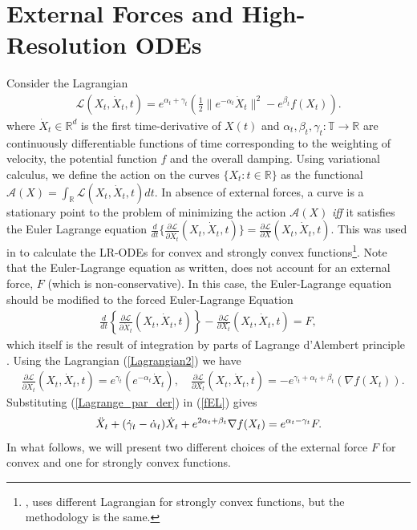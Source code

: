 \documentclass{article}
\theoremstyle{plain}
\theoremstyle{definition}
\theoremstyle{remark}
\begin{document}
 
\section{External Forces and High-Resolution ODEs}\label{section2}
Consider the Lagrangian
\begin{align}\label{Lagrangian2}
    \mathcal{L}(X_t,\dot{X}_t,t) =e^{\alpha_t+\gamma_t}\left(\frac{1}{2}\|e^{-\alpha_t}\dot{X}_t\|^2-e^{\beta_t}f(X_t)\right). 
\end{align}
where \(\dot{X}_t\in \mathbb{R}^d\) is the first time-derivative of \(X(t)\) and \(\alpha_t,\beta_t,\gamma_t:\mathbb{T}\rightarrow \mathbb{R}\) are continuously differentiable functions of time corresponding to the weighting of velocity, the potential function \(f\) and the overall damping. Using variational calculus, we define the action on the curves \(\{X_t:t\in \mathbb R\}\) as the functional \(\mathcal{A}(X)=\int_{\mathbb R}\mathcal{L}(X_t,\dot X_t,t)dt \). In absence of external forces, a curve is a stationary point to the problem of minimizing the action \(\mathcal{A}(X)\) \textit{iff} it satisfies the Euler Lagrange equation \({\tfrac{d}{dt}\{  \tfrac{\partial \mathcal{L}}{\partial \dot{X}_t}(X_t,\dot{X}_t,t)  \}=\tfrac{\partial \mathcal{L}}{\partial X}(X_t,\dot{X}_t,t)}\). This was used in \citep{WibisonoE7351,wilson2021lyapunov} to calculate the LR-ODEs for convex and strongly convex functions\footnote{\citep{wilson2021lyapunov}, uses different Lagrangian for strongly convex functions, but the methodology is the same.}. Note that the Euler-Lagrange equation as written, does not account for an external force, \(F\) (which is non-conservative). In this case, the Euler-Lagrange equation should be modified to the forced Euler-Lagrange Equation
\begin{align}\label{fEL}
        \frac{d}{dt}\left\{  \frac{\partial \mathcal{L}}{\partial \dot{X}_t}(X_t,\dot{X}_t,t)  \right\}-\frac{\partial \mathcal{L}}{\partial X_t}(X_t,\dot{X}_t,t)=F,
\end{align}
which itself is the result of integration by parts of Lagrange d'Alembert principle \citep{campos2021discrete}. Using the Lagrangian (\ref{Lagrangian2}) we have
\begin{align}\label{Lagrange_par_der}
  &   \frac{\partial \mathcal{L}}{\partial \dot{X}_t}(X_t,\dot{X}_t,t)  =e^{\gamma_t}(e^{-\alpha_t}\dot{X}_t),\quad \frac{\partial \mathcal{L}}{\partial X_t}(X_t,\dot{X}_t,t)= -e^{\gamma_t+\alpha_t+\beta_t}(\nabla f(X_t)).
\end{align}
Substituting (\ref{Lagrange_par_der}) in (\ref{fEL}) gives
\begin{align}\label{HR_general_ODE_F}
    \Ddot{X}_t + (\dot{\gamma}_t-\dot{\alpha}_t)\dot{X}_t+e^{2\alpha_t+\beta_t}\nabla f(X_t) =e^{\alpha_t-\gamma_t} F.
\end{align}
In what follows, we will present two different choices of the external force \(F\) for convex and one for strongly convex functions. 
\end{document}
